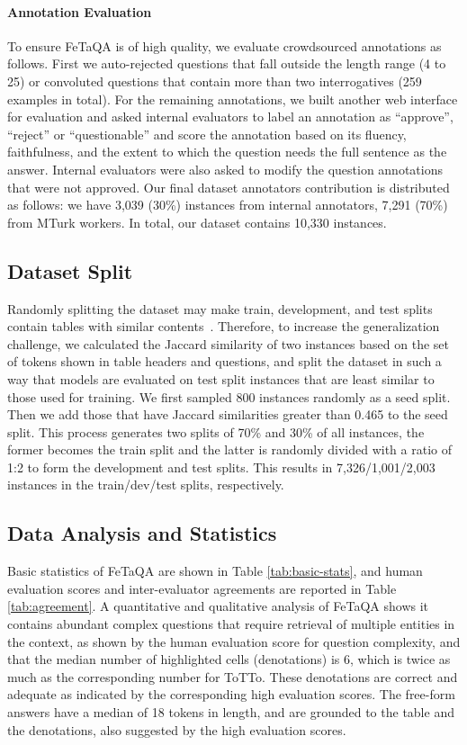 \documentclass[11pt,a4paper]{article}
\newcommand{\ours}{FeTaQA\xspace}
\begin{document}
\paragraph{Annotation Evaluation}
To ensure \ours is of high quality, we evaluate crowdsourced annotations as follows. 
First we auto-rejected questions that fall outside the length range (4 to 25) or convoluted questions that contain more than two interrogatives (259 examples in total).
For the remaining annotations, we built another web interface for evaluation and asked internal evaluators to label an annotation as ``approve'', ``reject'' or ``questionable'' and score the annotation based on its fluency, faithfulness, and the extent to which the question needs the full sentence as the answer. 
Internal evaluators were also asked to modify the question annotations that were not approved.
Our final dataset annotators contribution is distributed as follows: we have 3,039 (30\%) instances from internal annotators, 7,291 (70\%) from MTurk workers. In total, our dataset contains 10,330 instances.

\subsection{Dataset Split}
Randomly splitting the dataset may make train, development, and test splits contain tables with similar contents~\cite{dollak2018improving,lewis2020question}.
Therefore, to increase the generalization challenge, we calculated the Jaccard similarity of two instances based on the set of tokens shown in table headers and questions, and split the dataset in such a way that models are evaluated on test split instances that are least similar to those used for training. We first sampled 800 instances randomly as a seed split. Then we add those that have Jaccard similarities greater than 0.465 to the seed split. This process generates two splits of 70\% and 30\% of all instances, the former becomes the train split and the latter is randomly divided with a ratio of 1:2 to form the development and test splits. This results in 7,326/1,001/2,003 instances in the train/dev/test splits, respectively.

\subsection{Data Analysis and Statistics}
\label{sec:core_statistics}
Basic statistics of \ours are shown in Table \ref{tab:basic-stats}, and human evaluation scores and inter-evaluator agreements are reported in Table \ref{tab:agreement}. A quantitative and qualitative analysis of \ours shows it contains abundant complex questions that require retrieval of multiple entities in the context, as shown by the human evaluation score for question complexity, and that the median number of highlighted cells (denotations) is 6, which is twice as much as the corresponding number for ToTTo. These denotations are correct and adequate as indicated by the corresponding high evaluation scores. The free-form answers have a median of 18 tokens in length, and are grounded to the table and the denotations, also suggested by the high evaluation scores.
\end{document}
